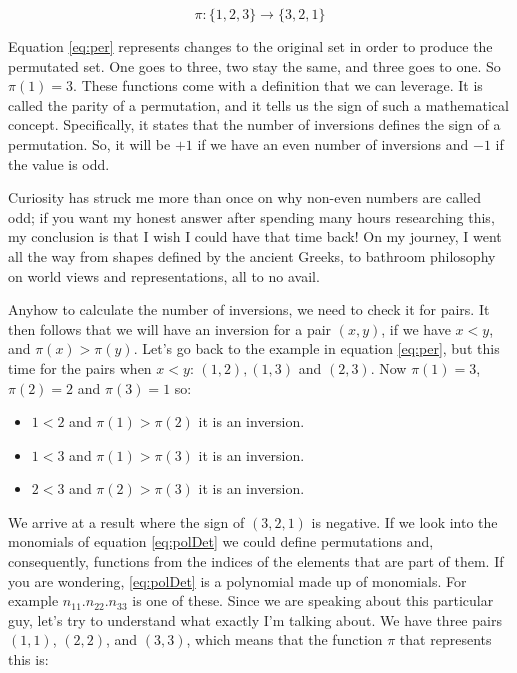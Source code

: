 \documentclass[a4,12pt,twosided,openany]{memoir}
\begin{document}
\begin{equation}\label{eq:per}
\pi:\lbrace 1,2,3 \rbrace \rightarrow \lbrace 3,2,1 \rbrace
\end{equation}
\par 
\indent
Equation \ref{eq:per} represents changes to the original set in order to produce the permutated set. One goes to three, two stay the same, and three goes to one. So $\pi(1) = 3$. These functions come with a definition that we can leverage. It is called the parity of a permutation, and it tells us the sign of such a mathematical concept. Specifically, it states that the number of inversions defines the sign of a permutation. So, it will be $+1$ if we have an even number of inversions and $-1$ if the value is odd. 
\par 
\indent
Curiosity has struck me more than once on why non-even numbers are called odd; if you want my honest answer after spending many hours researching this, my conclusion is that I wish I could have that time back! On my journey, I went all the way from shapes defined by the ancient Greeks, to bathroom philosophy on world views and representations, all to no avail. 
\par 
\indent
Anyhow to calculate the number of inversions, we need to check it for pairs. It then follows that we will have an inversion for a pair $(x,y)$, if we have $x<y$, and $\pi(x)>\pi(y)$. Let’s go back to the example in equation \ref{eq:per}, but this time for the pairs when $x<y$: $(1,2),(1,3)$ and $(2,3)$. Now $\pi(1)=3$, $\pi(2)=2$ and $\pi(3)=1$ so:
\begin{tcolorbox}
\begin{itemize}
\item $1<2$ and $\pi(1) > \pi(2)$ it is an inversion.
\item $1<3$ and $\pi(1) > \pi(3)$ it is an inversion.
\item $2< 3$ and $\pi(2) > \pi(3)$ it is an inversion.
\end{itemize}
\end{tcolorbox}
\par 
\indent
We arrive at a result where the sign of $(3,2,1)$ is negative. If we look into the monomials of equation \ref{eq:polDet} we could define permutations and, consequently, functions from the indices of the elements that are part of them. If you are wondering, \ref{eq:polDet} is a polynomial made up of monomials. For example $n_{11}.n_{22}.n_{33}$  is one of these. Since we are speaking about this particular guy, let’s try to understand what exactly I’m talking about. We have three pairs $(1,1)$, $(2,2)$, and $(3,3)$, which means that the function $\pi$ that represents this is:
\end{document}
